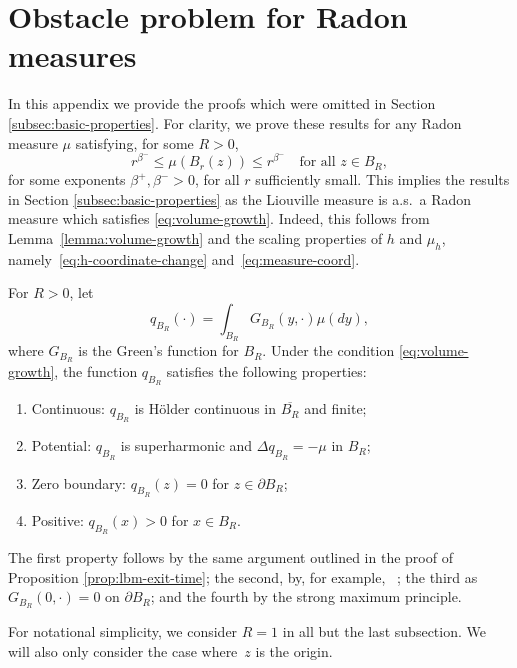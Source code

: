 \documentclass[12pt]{amsart}
\numberwithin{equation}{section}
\begin{document}
	
	
	
	
	\appendix
	
	\section{Obstacle problem for Radon measures} \label{sec:obstacle-appendix}
	
	In this appendix we provide the proofs which were omitted in Section \ref{subsec:basic-properties}. 
	For clarity, we prove these results for any Radon measure $\mu$ satisfying, for some $R > 0$,
	\begin{equation} \label{eq:volume-growth}
	r^{\beta^-} \leq \mu(B_r(z)) \leq r^{\beta^-} \quad \mbox{for all $z \in B_R$},
	\end{equation}
	for some exponents $\beta^+, \beta^- > 0$, for all $r$ sufficiently small. This implies the results in Section \ref{subsec:basic-properties} as the Liouville measure is a.s.\ a Radon measure which satisfies \eqref{eq:volume-growth}. Indeed, this follows from Lemma~\ref{lemma:volume-growth} and the scaling properties of $h$ and $\mu_h$, namely~\eqref{eq:h-coordinate-change} and~\eqref{eq:measure-coord}.
	
	For $R > 0$, let 
	\begin{equation} \label{eq:expected-exit-time}
	q_{B_R}(\cdot) = \int_{B_R} G_{B_R}(y,\cdot) \mu(dy),
	\end{equation} 
	where $G_{B_R}$ is the Green's function for $B_R$. 
	Under the condition \eqref{eq:volume-growth}, the function $q_{B_R}$ satisfies the following properties: 
	\begin{enumerate}
		\item Continuous: $q_{B_R}$ is H\"{o}lder continuous in $\overline{B_R}$ and finite;
		\item Potential: $q_{B_R}$ is superharmonic and $\Delta q_{B_R} = -\mu$  in $B_R$;
		\item Zero boundary: $q_{B_R}(z) = 0$ for $z \in \partial B_R$;
		\item Positive: $q_{B_R}(x) > 0$ for $x \in B_R$.
	\end{enumerate}
	The first property follows by the same argument outlined in the proof of Proposition \ref{prop:lbm-exit-time}; 
	the second, by, for example, ~\cite[Theorem 4.3.8]{armitage2000classical}; the third as $G_{B_R}(0, \cdot) = 0$ on $\partial B_R$;
	and the fourth by the strong maximum principle. 
	
	For notational simplicity, we consider $R = 1$ in all but the last subsection. We will also only consider the case where~$z$ is the origin.
	
\end{document}
